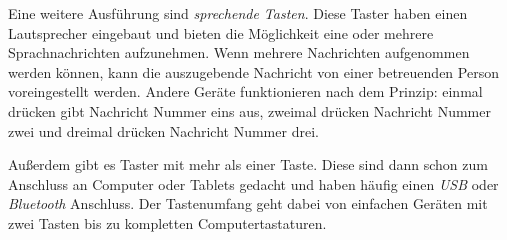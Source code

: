             Eine weitere Ausführung sind \emph{sprechende Tasten}. Diese Taster haben einen Lautsprecher eingebaut und bieten die Möglichkeit eine oder mehrere Sprachnachrichten aufzunehmen. Wenn mehrere Nachrichten aufgenommen werden können, kann die auszugebende Nachricht von einer betreuenden Person voreingestellt werden. Andere Geräte funktionieren nach dem Prinzip: einmal drücken gibt Nachricht Nummer eins aus, zweimal drücken Nachricht Nummer zwei und dreimal drücken Nachricht Nummer drei.
            
        	Außerdem gibt es Taster mit mehr als einer Taste. Diese sind dann schon zum Anschluss an Computer oder Tablets gedacht und haben häufig einen \emph{USB} oder \emph{Bluetooth} Anschluss. Der Tastenumfang geht dabei von einfachen Geräten mit zwei Tasten bis zu kompletten Computertastaturen.
            
